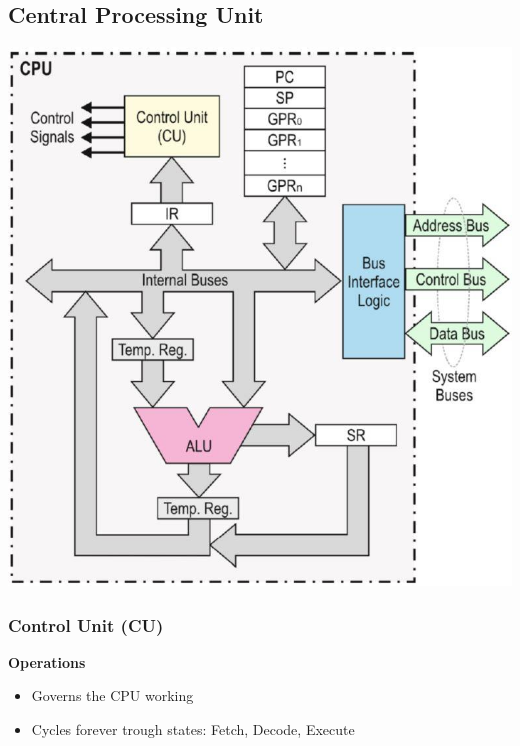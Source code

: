 \subsection{Central Processing Unit}
\begin{multicols}{2}
\includegraphics[width=\linewidth]{images/CPUComponents}
\begin{multicols}{2}
    \vspace*{-1cm}
\subsubsection{Control Unit (CU)}
    \textbf{Operations}
\begin{itemize}
    \item Governs the CPU working
    \item Cycles forever trough states:
        \subitem Fetch, Decode, Execute
\end{itemize}


\end{multicols}
\end{multicols}
